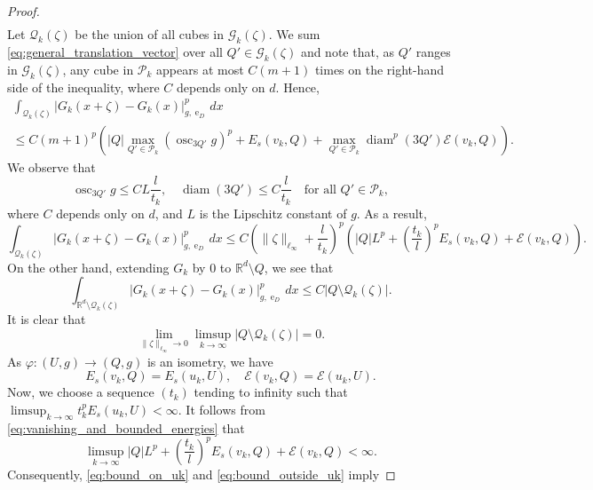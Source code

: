 \documentclass{article}
\numberwithin{equation}{section}
\theoremstyle{definition}
\theoremstyle{remark}
\DeclareMathOperator{\diam}{diam}
\DeclareMathOperator{\e}{e}
\DeclareMathOperator*{\osc}{osc}
\begin{document}
\begin{proof}
\begin{multline}
    \end{multline}
    Let $\mathcal{Q}_k(\zeta)$ be the union of all cubes in $\mathcal{G}_k(\zeta)$. We sum \eqref{eq:general_translation_vector} over all $Q' \in \mathcal{G}_k(\zeta)$ and note that, as $Q'$ ranges in $\mathcal{G}_k(\zeta)$, any cube in $\mathcal{P}_k$ appears at most $C(m + 1)$ times on the right-hand side of the inequality, where $C$ depends only on $d$. Hence,
    \begin{multline*}
        \int_{\mathcal{Q}_k(\zeta)} |G_k(x + \zeta) - G_k(x)|_{g, \e_D}^p \, dx \\
        \le C(m + 1)^p \left(|Q| \max_{Q' \in \mathcal{P}_k}\left(\osc_{3Q'} g\right)^p + E_s(v_k, Q) + \max_{Q' \in \mathcal{P}_k} \diam^p(3Q') \mathcal{E}(v_k, Q)\right).
    \end{multline*}
    We observe that
    \begin{equation} \label{eq:oscillation_and_diameter_bound}
        \osc_{3Q'} g \le CL\frac{l}{t_k}, \quad \diam(3Q') \le C \frac{l}{t_k} \quad \text{for all } Q' \in \mathcal{P}_k,
    \end{equation}
    where $C$ depends only on $d$, and $L$ is the Lipschitz constant of $g$. As a result,
    \begin{equation} \label{eq:bound_on_uk}
        \int_{\mathcal{Q}_k(\zeta)} |G_k(x + \zeta) - G_k(x)|_{g, \e_D}^p \, dx \le C \left(\|\zeta\|_{\ell_\infty} + \frac{l}{t_k}\right)^p \left(|Q| L^p + \left(\frac{t_k}{l}\right)^p E_s(v_k, Q) + \mathcal{E}(v_k, Q)\right).
    \end{equation}
    On the other hand, extending $G_k$ by 0 to $\mathbb{R}^d \setminus Q$, we see that
    \begin{equation} \label{eq:bound_outside_uk}
        \int_{\mathbb{R}^d \setminus \mathcal{Q}_k(\zeta)} |G_k(x + \zeta) - G_k(x)|_{g, \e_D}^p \, dx \le C |Q \setminus \mathcal{Q}_k(\zeta)|.
    \end{equation}
    It is clear that
    \[
    \lim_{\|\zeta\|_{\ell_\infty} \to 0} \limsup_{k \to \infty} |Q \setminus \mathcal{Q}_k(\zeta)| = 0.
    \]
    As $\varphi : (U, g) \rightarrow (Q, g)$ is an isometry, we have
    \[
    E_s(v_k, Q) = E_s(u_k, U), \quad \mathcal{E}(v_k, Q) = \mathcal{E}(u_k, U).
    \]
    Now, we choose a sequence $(t_k)$ tending to infinity such that $\limsup_{k \to \infty} t_k^p E_s(u_k, U) < \infty$. It follows from \eqref{eq:vanishing_and_bounded_energies} that
    \[
    \limsup_{k \to \infty} |Q| L^p + \left(\frac{t_k}{l}\right)^p E_s(v_k, Q) + \mathcal{E}(v_k, Q) < \infty.
    \]
    Consequently, \eqref{eq:bound_on_uk} and \eqref{eq:bound_outside_uk} imply

\end{proof}
\end{document}
